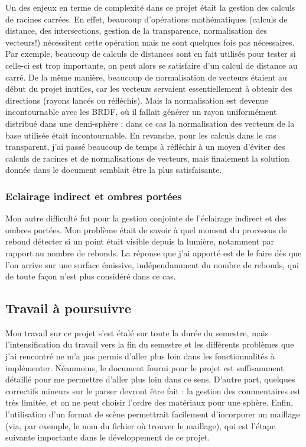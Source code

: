 \documentclass[a4paper,10pt]{article}
\begin{document}
Un des enjeux en terme de complexité dans ce projet était la gestion des calculs de racines carrées. En effet, beaucoup d'opérations mathématiques (calculs de distance, des intersections, gestion de la transparence, normalisation des vecteurs!) nécessitent cette opération mais ne sont quelques fois pas nécessaires. Par exemple, beaucoup de calculs de distances sont en fait utilisés pour tester si celle-ci est trop importante, on peut alors se satisfaire d'un calcul de distance au carré. De la même manière, beaucoup de normalisation de vecteurs étaient au début du projet inutiles, car les vecteurs servaient essentiellement à obtenir des directions (rayons lancés ou réfléchis). Mais la normalisation est devenue incontournable avec les BRDF, où il fallait générer un rayon uniformément distribué dans une demi-sphère : dans ce cas la normalisation des vecteurs de la base utilisée était incontournable. En revanche, pour les calculs dans le cas transparent, j'ai passé beaucoup de temps à réfléchir à un moyen d'éviter des calculs de racines et de normalisations de vecteurs, mais finalement la solution donnée dans le document semblait être la plus satisfaisante.

\subsubsection{Eclairage indirect et ombres portées}

Mon autre difficulté fut pour la gestion conjointe de l'éclairage indirect et des ombres portées. Mon problème était de savoir à quel moment du processus de rebond détecter si un point était visible depuis la lumière, notamment par rapport au nombre de rebonds. La réponse que j'ai apporté est de le faire dès que l'on arrive sur une surface émissive, indépendamment du nombre de rebonds, qui de toute façon n'est plus considéré dans ce cas.

\subsection{Travail à poursuivre}

Mon travail sur ce projet s'est étalé sur toute la durée du semestre, mais l'intensification du travail vers la fin du semestre et les différents problèmes que j'ai rencontré ne m'a pas permis d'aller plus loin dans les fonctionnalités à implémenter. Néanmoins, le document fourni pour le projet est suffisamment détaillé pour me permettre d'aller plus loin dans ce sens. D'autre part, quelques correctifs mineurs sur le parser devront être fait : la gestion des commentaires est très limitée, et on ne peut choisir l'ordre des matériaux pour une sphère. Enfin, l'utilisation d'un format de scène permettrait facilement d'incorporer un maillage (via, par exemple, le nom du fichier où trouver le maillage), qui est l'étape suivante importante dans le développement de ce projet.
\end{document}
